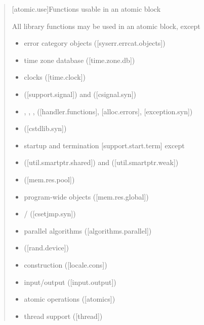 \begin{quote}
[atomic.use]{Functions usable in an atomic block}

\pnum
All library functions may be used in an atomic block, except

\begin{itemize}
\item
  error category objects ({[}syserr.errcat.objects{]})
\item
  time zone database ({[}time.zone.db{]})
\item
  clocks ({[}time.clock{]})
\item
   ({[}support.signal{]}) and 
  ({[}csignal.syn{]})
\item
  , ,
  , 
  ({[}handler.functions{]}, {[}alloc.errors{]}, {[}exception.syn{]})
\item
   ({[}cstdlib.syn{]})
\item
  startup and termination {[}support.start.term{]} except
\item
   ({[}util.smartptr.shared{]}) and
   ({[}util.smartptr.weak{]})
\item
   ({[}mem.res.pool{]})
\item
  program-wide  objects
  ({[}mem.res.global{]})
\item
   /  ({[}csetjmp.syn{]})
\item
  parallel algorithms ({[}algorithms.parallel{]})
\item
   ({[}rand.device{]})
\item
   construction ({[}locale.cons{]})
\item
  input/output ({[}input.output{]})
\item
  atomic operations ({[}atomics{]})
\item
  thread support ({[}thread{]})
\end{itemize}
\end{quote}

